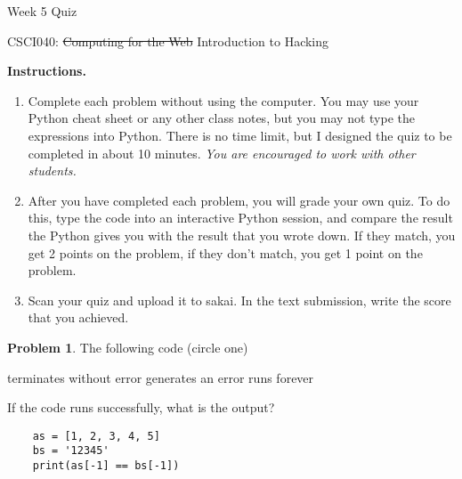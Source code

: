 \documentclass[10pt]{article}
\theoremstyle{definition}
\newtheorem{problem}{Problem}
\begin{document}
\begin{center}
    {
\Large
Week 5 Quiz
}

    \vspace{0.1in}
    CSCI040: \sout{Computing for the Web} Introduction to Hacking

    \vspace{0.1in}
\end{center}

\vspace{0.15in}
%
%

\noindent\textbf{Instructions.}
\begin{enumerate}
\item
Complete each problem without using the computer.  
You may use your Python cheat sheet or any other class notes,
but you may not type the expressions into Python.
There is no time limit, but I designed the quiz to be completed in about 10 minutes.
\emph{You are encouraged to work with other students.}
\item
After you have completed each problem, you will grade your own quiz.
To do this, type the code into an interactive Python session,
and compare the result the Python gives you with the result that you wrote down.
If they match, you get 2 points on the problem,
if they don't match, you get 1 point on the problem.
\item
Scan your quiz and upload it to sakai.
In the text submission, write the score that you achieved.
\end{enumerate}
\vspace{0.15in}

\begin{problem}
    The following code (circle one)

    \vspace{0.25in}
    \hspace{0.5in}terminates without error 
    \hspace{1in}generates an error
    \hspace{1in}runs forever
    \vspace{0.25in}

    \noindent
    If the code runs successfully, what is the output?
\end{problem}
\begin{lstlisting}
    as = [1, 2, 3, 4, 5]
    bs = '12345'
    print(as[-1] == bs[-1])
\end{lstlisting}
\vspace{1.5in}
\end{document}
